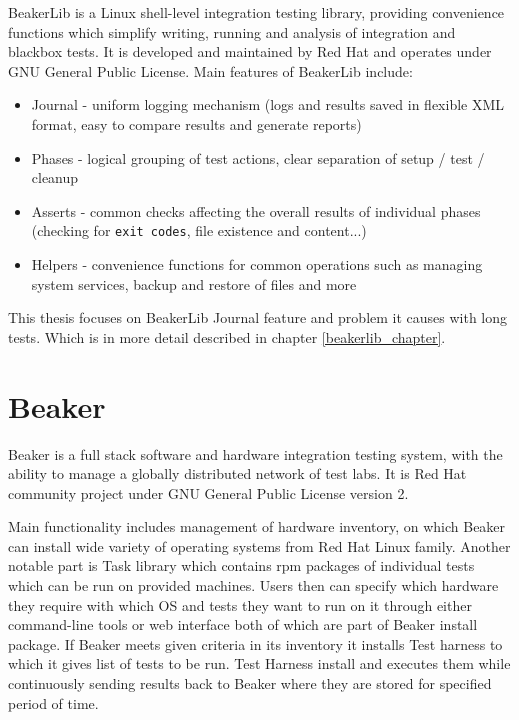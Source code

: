 BeakerLib is a Linux shell-level integration testing library, providing convenience functions which simplify writing, running and analysis of integration and blackbox tests\cite{beakerlib_wiki}.
It is developed and maintained by Red Hat and operates under GNU General Public License.
Main features of BeakerLib include:
\begin{itemize}
\item Journal - uniform logging mechanism (logs and results saved in flexible XML format, easy to compare results and generate reports)
\item Phases - logical grouping of test actions, clear separation of setup / test / cleanup
\item Asserts - common checks affecting the overall results of individual phases (checking for \texttt{exit codes}, file existence and content...)
\item Helpers - convenience functions for common operations such as managing system services, backup and restore of files and more
\end{itemize}


This thesis focuses on BeakerLib Journal feature and problem it causes with long tests. Which is in more detail described in chapter \ref{beakerlib_chapter}.


\section{Beaker}

Beaker\cite{beaker_doc} is a full stack software and hardware integration testing system, with the ability to manage a globally distributed network of test labs.  It is Red Hat community project under GNU General Public License version 2.

Main functionality includes management of hardware inventory, on which Beaker can install wide variety  of operating systems from Red Hat Linux family. Another notable part  is Task library which contains rpm packages of individual tests which can be run on provided machines. 
Users then can specify which hardware they require with which OS and tests they want to run on it through either command-line tools or web interface both of which are part of Beaker install package. If Beaker meets given criteria in its inventory it installs Test harness to which it gives list of tests to be run.  Test Harness install and executes them while continuously sending results back to Beaker where they are stored for specified period of time. 

